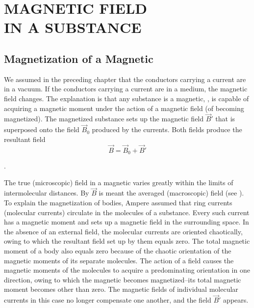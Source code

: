 

\chapter[MAGNETIC FIELD IN A SUBSTANCE]{MAGNETIC FIELD\\ IN A SUBSTANCE}\label{chap:7}

\section{Magnetization of a Magnetic}\label{sec:7_1}

We assumed in the preceding chapter that the conductors carrying a current are in a vacuum.
If the conductors carrying a current are in a medium, the magnetic field changes.
The explanation is that any substance is a magnetic, \ie, is capable of acquiring a magnetic moment under the action of a magnetic field (of becoming magnetized).
The magnetized substance sets up the magnetic field $\vec{B}'$ that
is superposed onto the field $\vec{B}_0$ produced by the currents.
Both fields produce the resultant field
\begin{equation}\label{eq:7_1}
    \vec{B} = \vec{B}_0 + \vec{B}'
\end{equation}

.

The true (microscopic) field in a magnetic varies greatly within the limits of intermolecular distances.
By $\vec{B}$ is meant the averaged (macroscopic) field (see ).
To explain the magnetization of bodies, Ampere assumed that ring currents (molecular currents) circulate in the molecules of a substance.
Every such current has a magnetic moment and sets up a magnetic field in the surrounding space.
In the absence of an external field, the molecular currents are oriented chaotically, owing to which the resultant field set up by them equals zero.
The total magnetic moment of a body also equals zero because of the chaotic orientation of the magnetic moments of its separate molecules.
The action of a field causes the magnetic moments of the molecules to acquire a predominating orientation in one direction, owing to which the magnetic becomes magnetized--its total magnetic moment becomes other than zero.
The magnetic fields of individual molecular currents in this case no longer compensate one another, and the field $\vec{B}'$ appears.

